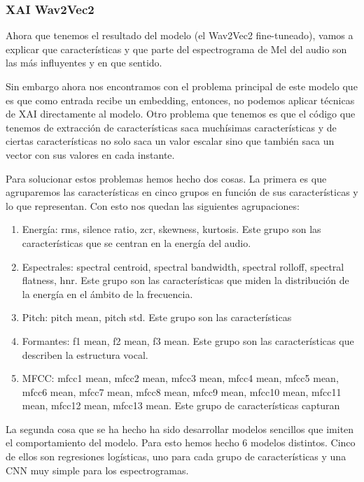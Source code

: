 \subsubsection{XAI Wav2Vec2}

Ahora que tenemos el resultado del modelo (el Wav2Vec2 fine-tuneado), vamos a explicar que características y que parte del espectrograma de Mel del audio son las más influyentes y en que sentido.

Sin embargo ahora nos encontramos con el problema principal de este modelo que es que como entrada recibe un embedding, entonces, no podemos aplicar técnicas de XAI directamente al modelo. Otro problema que tenemos es que el código que tenemos de extracción de características saca muchísimas características y de ciertas características no solo saca un valor escalar sino que también saca un vector con sus valores en cada instante.

Para solucionar estos problemas hemos hecho dos cosas. La primera es que agruparemos las características en cinco grupos en función de sus características y lo que representan. Con esto nos quedan las siguientes agrupaciones:

\begin{enumerate}
 \item Energía: rms, silence ratio, zcr, skewness, kurtosis. Este grupo son las características que se centran en la energía del audio.
 \item Espectrales: spectral centroid, spectral bandwidth, spectral rolloff, spectral flatness, hnr. Este grupo son las características que miden la distribución de la energía en el ámbito de la frecuencia.
 \item Pitch: pitch mean, pitch std. Este grupo son las características %
 \item Formantes:  f1 mean, f2 mean, f3 mean. Este grupo son las características que describen la estructura vocal.
 \item MFCC: mfcc1 mean, mfcc2 mean,  mfcc3 mean, mfcc4 mean,  mfcc5 mean, mfcc6 mean,  mfcc7 mean, mfcc8 mean,  mfcc9 mean, mfcc10 mean,  mfcc11 mean, mfcc12 mean,  mfcc13 mean. Este grupo de características capturan %
	\end{enumerate}

La segunda cosa que se ha hecho ha sido desarrollar modelos sencillos que imiten el comportamiento del modelo. Para esto hemos hecho 6 modelos distintos. Cinco de ellos son regresiones logísticas, uno para cada grupo de características y una CNN muy simple para los espectrogramas.

